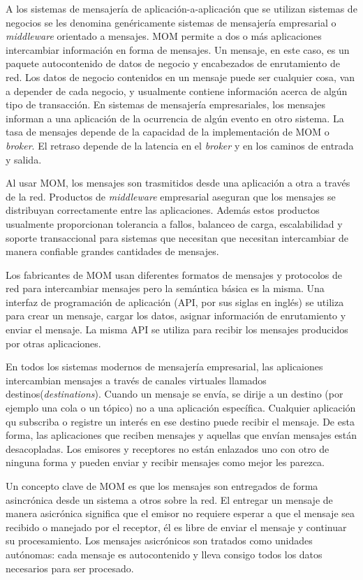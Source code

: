 \documentclass[11pt, twoside]{report}
\begin{document}
A los sistemas de mensajería de aplicación-a-aplicación que se utilizan sistemas de negocios se les denomina genéricamente sistemas de mensajería empresarial o \emph{middleware} orientado a mensajes\cite{jms20}. MOM permite a dos o más aplicaciones intercambiar información en forma de mensajes. Un mensaje, en este caso, es un paquete autocontenido de datos de negocio y encabezados de enrutamiento de red. Los datos de negocio contenidos en un mensaje puede ser cualquier cosa, van a depender de cada negocio, y usualmente contiene información acerca de algún tipo de transacción. En sistemas de mensajería empresariales, los mensajes informan a una aplicación de la ocurrencia de algún evento en otro sistema. La tasa de mensajes depende de la capacidad de la implementación de MOM o \emph{broker}. El retraso depende de la latencia en el \emph{broker} y en los caminos de entrada y salida\cite{chew}.

Al usar MOM, los mensajes son trasmitidos desde una aplicación a otra a través de la red. Productos de \emph{middleware} empresarial aseguran que los mensajes se distribuyan correctamente entre las aplicaciones. Además estos productos usualmente proporcionan tolerancia a fallos, balanceo de carga, escalabilidad y soporte transaccional para sistemas que necesitan que necesitan intercambiar de manera confiable grandes cantidades de mensajes.

Los fabricantes de MOM usan diferentes formatos de mensajes y protocolos de red para intercambiar mensajes pero la semántica básica es la misma. Una interfaz de programación de aplicación (API, por sus siglas en inglés) se utiliza para crear un mensaje, cargar los datos, asignar información de enrutamiento y enviar el mensaje. La misma API se utiliza para recibir los mensajes producidos por otras aplicaciones.

En todos los sistemas modernos de mensajería empresarial, las aplicaiones intercambian mensajes a través de canales virtuales llamados destinos(\emph{destinations}). Cuando un mensaje se envía, se dirije a un destino (por ejemplo una cola o un tópico) no a una aplicación específica. Cualquier aplicación qu subscriba o registre un interés en ese destino puede recibir el mensaje. De esta forma, las aplicaciones que reciben mensajes y aquellas que envían mensajes están desacopladas. Los emisores y receptores no están enlazados uno con otro de ninguna forma y pueden enviar y recibir mensajes como mejor les parezca.

Un concepto clave de MOM es que los mensajes son entregados de forma asincrónica desde un sistema a otros sobre la red. El entregar un mensaje de manera asicrónica significa que el emisor no requiere esperar a que el mensaje sea recibido o manejado por el receptor, él es libre de enviar el mensaje y continuar su procesamiento. Los mensajes asicrónicos son tratados como unidades autónomas: cada mensaje es autocontenido y lleva consigo todos los datos necesarios para ser procesado.
\end{document}
